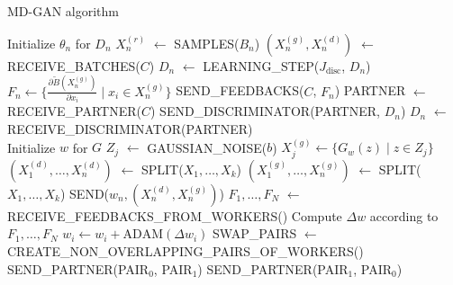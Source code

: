 \begin{algorithm}[H]
    \caption{MD-GAN algorithm}
    \begin{algorithmic}[1]
        \State Initialize $\theta_n$ for $D_n$
            \State $X_n^{(r)}$ $\gets$ SAMPLES($B_n$)
            \State $(X_n^{(g)}, X_n^{(d)})$ $\gets$ RECEIVE\_BATCHES($C$)
                \State $D_n$ $\gets$ LEARNING\_STEP($J_{\text{disc}}$, $D_n$)
            \EndFor
            \State $F_n \gets \{\frac{\partial \tilde{B}(X_n^(g))}{\partial x_i} \mid x_i \in X_n^{(g)} \}$
            \State SEND\_FEEDBACKS($C$, $F_n$)
                \State PARTNER $\gets$ RECEIVE\_PARTNER($C$)
                \State SEND\_DISCRIMINATOR(PARTNER, $D_n$)
                \State $D_n$ $\gets$ RECEIVE\_DISCRIMINATOR(PARTNER)
            \EndIf
        \EndFor
    \EndProcedure
    \\
        \State Initialize $w$ for $G$
                \State $Z_j$ $\gets$ GAUSSIAN\_NOISE($b$)
                \State $X_j^{(g)} \gets \{G_w(z) \mid z \in Z_j\}$
            \EndFor
            \State $(X_1^{(d)}, \dots, X_n^{(d)})$ $\gets$ SPLIT($X_1, \dots, X_k$)
            \State $(X_1^{(g)}, \dots, X_n^{(g)})$ $\gets$ SPLIT($X_1, \dots, X_k$)
                \State SEND($w_n, (X_n^{(d)}, X_n^{(g)})$)
            \EndFor
        \EndFor
        \State $F_1, \dots, F_N$ $\gets$ RECEIVE\_FEEDBACKS\_FROM\_WORKERS()
        \State Compute $\Delta w$ according to $F_1, \dots, F_N$
            \State $w_i \gets w_i + \text{ADAM}(\Delta w_i)$
        \EndFor
            \State SWAP\_PAIRS $\gets$ CREATE\_NON\_OVERLAPPING\_PAIRS\_OF\_WORKERS()
                \State SEND\_PARTNER(PAIR$_0$, PAIR$_1$)
                \State SEND\_PARTNER(PAIR$_1$, PAIR$_0$)
            \EndFor
        \EndIf
    \EndProcedure
    \end{algorithmic}
\end{algorithm}
